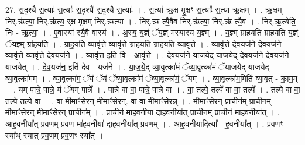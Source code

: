 \documentclass[17pt]{extarticle}
\begin{document}
27. स॒दृश्यै॑ स॒त्याः᳚ स॒त्याः᳚ स॒दृश्यै॑ स॒दृश्यै॑ स॒त्याः᳚ । . स॒त्या॑ ऋ॒क्ष मृ॒क्षꣳ स॒त्याः᳚ स॒त्या॑ ऋ॒क्षम् । . ऋ॒क्षम् निर्.ऋ॑त्या॒ निर्.ऋ॑त्य॒ र्‌क्ष मृ॒क्षम् निर्.ऋ॑त्या । . निर्.ऋ॑ त्यै॒वैव निर्.ऋ॑त्या॒ निर्.ऋ॑ त्यै॒व । . निर्.ऋ॒त्येति॒ निः - ऋ॒त्या॒ । . ए॒वास्या᳚ स्यै॒वै वास्य॑ । . अ॒स्य॒ य॒ज्ञ्ं ॅय॒ज्ञ् म॑स्यास्य य॒ज्ञ्म् । . य॒ज्ञ्म् ग्रा॑हयति ग्राहयति य॒ज्ञ्ं ॅय॒ज्ञ्म् ग्रा॑हयति । . ग्रा॒ह॒य॒ति॒ व्यावृ॑त्ते॒ व्यावृ॑त्ते ग्राहयति ग्राहयति॒ व्यावृ॑त्ते । . व्यावृ॑त्ते देव॒यज॑ने देव॒यज॑ने॒ व्यावृ॑त्ते॒ व्यावृ॑त्ते देव॒यज॑ने । . व्यावृ॑त्त॒ इति॑ वि - आवृ॑त्ते । . दे॒व॒यज॑ने याजयेद् याजयेद् देव॒यज॑ने देव॒यज॑ने याजयेत् । . दे॒व॒यज॑न॒ इति॑ देव - यज॑ने । . या॒ज॒ये॒द् व्या॒वृत्का॑मं ॅव्या॒वृत्का॑मं ॅयाजयेद् याजयेद् व्या॒वृत्का॑मम् । . व्या॒वृत्का॑मं॒ ॅयं ॅयं ॅव्या॒वृत्का॑मं ॅव्या॒वृत्का॑मं॒ ॅयम् । . व्या॒वृत्का॑म॒मिति॑ व्या॒वृत् - का॒म॒म् । . यम् पात्रे॒ पात्रे॒ यं ॅयम् पात्रे᳚ । . पात्रे॑ वा वा॒ पात्रे॒ पात्रे॑ वा । . वा॒ तल्पे॒ तल्पे॑ वा वा॒ तल्पे᳚ । . तल्पे॑ वा वा॒ तल्पे॒ तल्पे॑ वा । . वा॒ मीमाꣳ॑सेर॒न् मीमाꣳ॑सेरन्. वा वा॒ मीमाꣳ॑सेरन्न् । . मीमाꣳ॑सेरन् प्रा॒चीन॑म् प्रा॒चीन॒म् मीमाꣳ॑सेर॒न् मीमाꣳ॑सेरन् प्रा॒चीन᳚म् । . प्रा॒चीन॑ माहव॒नीया॑ दाहव॒नीया᳚त् प्रा॒चीन॑म् प्रा॒चीन॑ माहव॒नीया᳚त् । . आ॒ह॒व॒नीया᳚त् प्रव॒णम् प्र॑व॒ण मा॑हव॒नीया॑ दाहव॒नीया᳚त् प्रव॒णम् । . आ॒ह॒व॒नीया॒दित्या᳚ - ह॒व॒नीया᳚त् । . प्र॒व॒णꣳ स्या᳚थ् स्यात् प्रव॒णम् प्र॑व॒णꣳ स्या᳚त् । \newline
\end{document}
